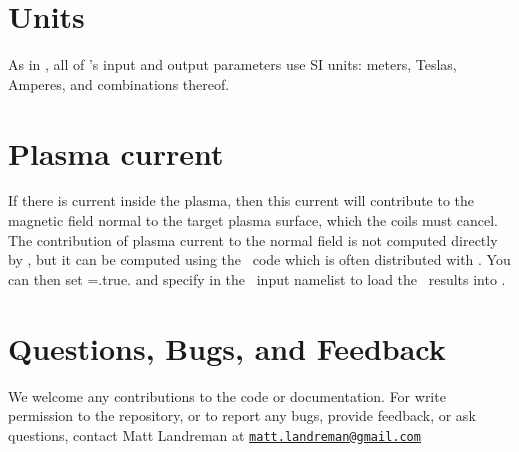 \section{Units}

As in \vmec, all of \regcoil's input and output parameters use SI units: meters, Teslas, Amperes, and combinations thereof.

\section{Plasma current}

If there is current inside the plasma, then this current will contribute to the magnetic field normal
to the target plasma surface, which the coils must cancel. The contribution of plasma current to the normal field
is not computed directly by \regcoil, but it can be computed using the \bnorm~code which is 
often distributed with \vmec.  You can then set ={\ttfamily .true.} and specify 
in the \regcoil~input namelist to load the \bnorm~results into \regcoil.

\section{Questions, Bugs, and Feedback}

We welcome any contributions to the code or documentation.
For write permission to the repository, or to report any bugs, provide feedback, or ask questions, contact Matt Landreman at
\href{mailto:matt.landreman@gmail.com}{\nolinkurl{matt.landreman@gmail.com} }






